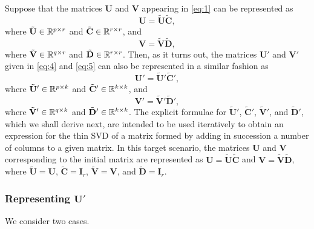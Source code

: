 \documentclass[11pt,a4paper]{article}
\theoremstyle{mybreak}
\numberwithin{dummy}{section}
\theoremstyle{plain}
\theoremstyle{plain}
\theoremstyle{plain}
\theoremstyle{plain}
\theoremstyle{MyNonumberplain}
\newcommand{\0}{\M{0}}
\newcommand{\M}[1]{\mathbf{#1}}
\newcommand{\Mt}[1]{\tilde{\M{#1}}}
\newcommand{\R}{\mathbb{R}}
\newcommand{\Mat}[2]{%
  \ifthenelse{\equal{#2}{1}}
  {\R^{#1}}
  {\R^{#1 \times #2}}
}
\begin{document}
Suppose that the matrices $\M{U}$ and $\M{V}$ appearing in \eqref{eq:1} can be represented as
\begin{equation}
  \label{eq:15}
  \M{U} = \Mt{U} \Mt{C},
 \end{equation}
 where $\Mt{U} \in \Mat{p}{r}$ and $\Mt{C} \in \Mat{r}{r}$, and
\begin{equation}
  \label{eq:16}
  \M{V} = \Mt{V} \Mt{D}, 
 \end{equation}
 where $\Mt{V} \in \Mat{q}{r}$ and $\Mt{D} \in \Mat{r}{r}$.  Then, as it turns out, the matrices $\M{U}'$ and $\M{V}'$ given in \eqref{eq:4} and \eqref{eq:5} can also be represented in a similar fashion as
\begin{equation}
  \label{eq:17}
  \M{U}' = \Mt{U}' \Mt{C}', 
\end{equation}
where $\Mt{U}' \in \Mat{p}{k}$ and $\Mt{C}' \in \Mat{k}{k}$, and
\begin{equation}
  \label{eq:18}
  \M{V}' = \Mt{V}' \Mt{D}', 
\end{equation}
where $\Mt{V}' \in \Mat{q}{k}$ and $\Mt{D}' \in \Mat{k}{k}$.  The explicit formulae for $\Mt{U}'$, $\Mt{C}'$, $\Mt{V}'$, and $\Mt{D}'$, which we shall derive next, are intended to be used iteratively to obtain an expression for the thin SVD of a matrix formed by adding in succession a number of columns to a given matrix. In this target scenario, the matrices $\M{U}$ and $\M{V}$ corresponding to the initial matrix are represented as $\M{U} = \Mt{U} \Mt{C}$ and $\M{V} = \Mt{V} \Mt{D}$, where $\Mt{U} = \M{U}$, $\Mt{C} = \M{I}_r$, $\Mt{V} = \M{V}$, and $\Mt{D} = \M{I}_r$.

\subsubsection{Representing $\M{U}'$}

We consider two cases.
\end{document}

